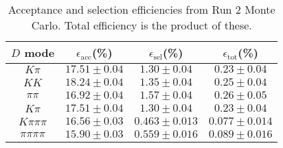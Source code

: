 \begin{table}[H]
    \centering
    \begin{tabular}{cccc}
        \toprule
        $D$ mode & $\epsilon_\mathrm{acc}$(\%) &  $\epsilon_\mathrm{sel}$(\%) &  $\epsilon_\mathrm{tot}$(\%) \\
        \midrule
        $K\pi$ & $17.51 \pm 0.04$ & $1.30 \pm 0.04$ & $0.23 \pm 0.04$ \\
        $KK$ & $18.24 \pm 0.04$ & $1.35 \pm 0.04$ & $0.25 \pm 0.04$ \\
        $\pi\pi$ & $16.92 \pm 0.04$ & $1.57 \pm 0.04$ & $0.26 \pm 0.05$ \\
        $K\pi$ & $17.51 \pm 0.04$ & $1.30 \pm 0.04$ & $0.23 \pm 0.04$ \\
        $K\pi\pi\pi$ & $16.56 \pm 0.03$ & $0.463 \pm 0.013$ & $0.077 \pm 0.014$ \\
        $\pi\pi\pi\pi$ & $15.90 \pm 0.03$ & $0.559 \pm 0.016$ & $0.089 \pm 0.016$ \\
        \bottomrule
    \end{tabular}
    \caption{Acceptance and selection efficiencies from  Run 2 Monte Carlo. Total efficiency is the  product of these.}
\label{tab:selection_efficiency_run2}
\end{table}
